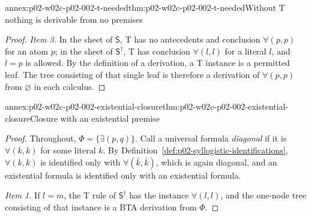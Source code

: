 \begin{annexitem}{annex:p02-w02c-p02-002-t-needed}{thm:p02-w02c-p02-002-t-needed}{Without T nothing is derivable from no premises}
\begin{proof}
\emph{Item 3.} In the sheet of \(\mathsf S\), T has no antecedents and
conclusion \(\forall(p,p)\) for an atom \(p\); in the sheet of
\(\mathsf S^\dagger\), T has conclusion \(\forall(l,l)\) for a literal \(l\),
and \(l=p\) is allowed. By the definition of a derivation, a T instance is a
permitted leaf. The tree consisting of that single leaf is therefore a
derivation of \(\forall(p,p)\) from \(\varnothing\) in each calculus.
\end{proof}
\end{annexitem}

\begin{annexitem}{annex:p02-w02c-p02-002-existential-closure}{thm:p02-w02c-p02-002-existential-closure}{Closure with an existential premise}
\begin{proof}
Throughout, \(\Phi=\{\exists(p,q)\}\). Call a universal formula
\emph{diagonal} if it is \(\forall(k,k)\) for some literal \(k\).
By Definition~\ref{def:p02-syllogistic-identifications}, \(\forall(k,k)\) is
identified only with \(\forall(\bar k,\bar k)\), which is again diagonal,
and an existential formula is identified only with an existential formula.

\emph{Item 1.} If \(l=m\), the T rule of \(\mathsf S^\dagger\) has the
instance \(\forall(l,l)\), and the one-node tree consisting of that instance
is a BTA derivation from \(\Phi\).


\end{proof}
\end{annexitem}
